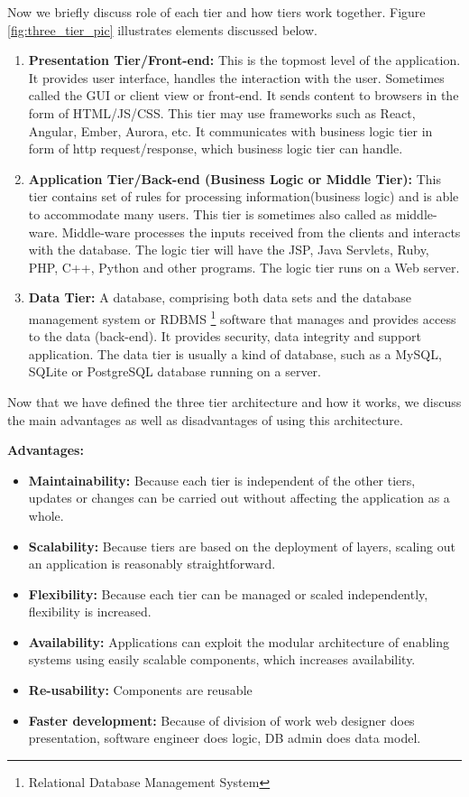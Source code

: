 Now we briefly discuss role of each tier and how tiers work together. Figure \ref{fig:three_tier_pic} illustrates elements discussed below.
\begin{enumerate}
    \item \textbf{Presentation Tier/Front-end:}  
    This is the topmost level of the application.
    It provides user interface, handles the interaction with the user. Sometimes called the GUI or client view or front-end.
    It sends content to browsers in the form of HTML/JS/CSS. This tier may use frameworks such as React, Angular, Ember, Aurora, etc.
    It communicates with business logic tier in form of http request/response, which business logic tier can handle.
    \item \textbf{Application Tier/Back-end (Business Logic or Middle Tier):}
    This tier contains set of rules for processing information(business logic) and is able to accommodate many users. This tier is sometimes also called as middle-ware.
    Middle-ware processes the inputs received from the clients and interacts with the database.
    The logic tier will have the JSP, Java Servlets, Ruby, PHP, C++, Python and other programs. The logic tier runs on a Web server.
    \item \textbf{Data Tier:}
    A database, comprising both data sets and the database management system or RDBMS \footnote{Relational Database Management System} software that manages and provides access to the data (back-end).
    It provides security, data integrity and support application.
    The data tier is usually a kind of database, such as a MySQL, SQLite or PostgreSQL database running on a server.
\end{enumerate}
   

Now that we have defined the three tier architecture and how it works, we discuss the main advantages as well as disadvantages of using this architecture.

\textbf{Advantages:}
\begin{itemize}
    \item \textbf{Maintainability:}
    Because each tier is independent of the other tiers, updates or changes can be carried out without affecting the application as a whole.
    \item \textbf{Scalability:}
    Because tiers are based on the deployment of layers, scaling out an application is reasonably straightforward.
    \item \textbf{Flexibility:}
    Because each tier can be managed or scaled independently, flexibility is increased.
    \item \textbf{Availability:}
    Applications can exploit the modular architecture of enabling systems using easily scalable components, which increases availability.
    \item \textbf{Re-usability:} 
    Components are reusable
    \item \textbf{Faster development:}
    Because of division of work web designer does presentation, software engineer does logic, DB admin does data model.
\end{itemize}
   
